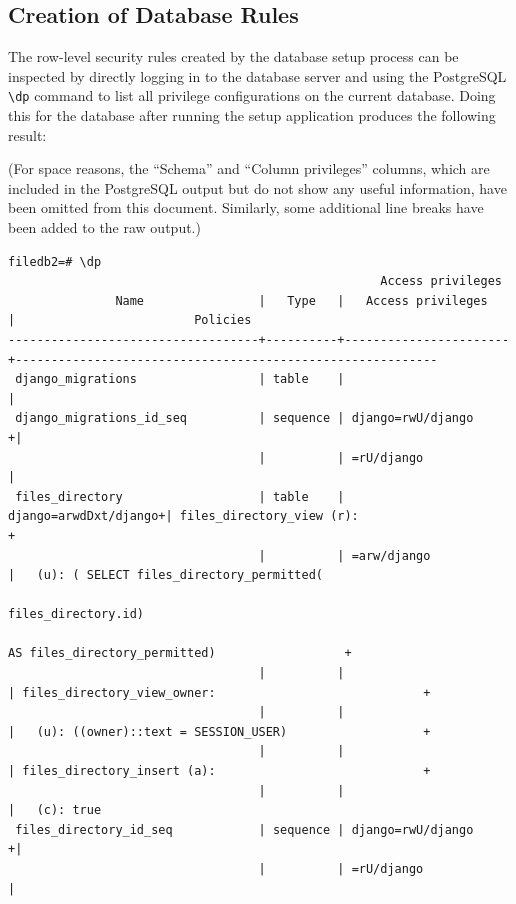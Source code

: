 \documentclass[12pt]{report}
\begin{document}
\begin{landscape}
  \section{Creation of Database Rules}
  The row-level security rules created by the database setup process can be inspected by directly logging in to the database server and using the PostgreSQL \verb+\dp+ command to list all privilege configurations on the current database. Doing this for the database after running the setup application produces the following result:

  (For space reasons, the ``Schema'' and ``Column privileges'' columns, which are included in the PostgreSQL output but do not show any useful information, have been omitted from this document. Similarly, some additional line breaks have been added to the raw output.)
  {\footnotesize
\begin{verbatim}
filedb2=# \dp
                                                    Access privileges
               Name                |   Type   |   Access privileges   |                         Policies
-----------------------------------+----------+-----------------------+-----------------------------------------------------------
 django_migrations                 | table    |                       |
 django_migrations_id_seq          | sequence | django=rwU/django    +|
                                   |          | =rU/django            |
 files_directory                   | table    | django=arwdDxt/django+| files_directory_view (r):                               +
                                   |          | =arw/django           |   (u): ( SELECT files_directory_permitted(
                                                                                 files_directory.id)
                                                                                 AS files_directory_permitted)                  +
                                   |          |                       | files_directory_view_owner:                             +
                                   |          |                       |   (u): ((owner)::text = SESSION_USER)                   +
                                   |          |                       | files_directory_insert (a):                             +
                                   |          |                       |   (c): true
 files_directory_id_seq            | sequence | django=rwU/django    +|
                                   |          | =rU/django            |

\end{verbatim}}
\end{landscape}
\end{document}
